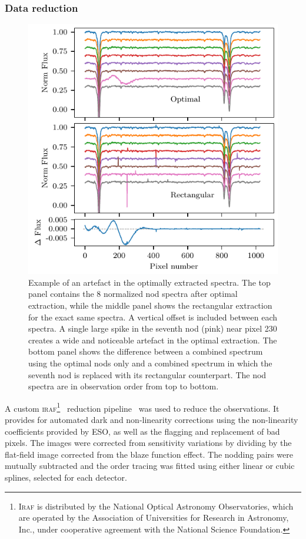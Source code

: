 \documentclass[fleqn,usenatbib]{mnras}
\begin{document}
    \subsubsection{Data reduction}
    \label{subsubsec:reduction}
    \begin{figure}
        \includegraphics[width=\hsize]{images/fig1.pdf}
        \caption{Example of an artefact in the optimally extracted spectra. The top panel contains the 8 normalized nod spectra after optimal extraction, while the middle panel shows the rectangular extraction for the exact same spectra. A vertical offset is included between each spectra. A single large spike in the seventh nod (pink) near pixel 230 creates a wide and noticeable artefact in the optimal extraction. The bottom panel shows the difference between a combined spectrum using the optimal nods only and a combined spectrum in which the seventh nod is replaced with its rectangular counterpart. The nod spectra are in observation order from top to bottom.}
        \label{fig:nod_artefacts}
    \end{figure}
    
    A custom \textsc{iraf}\footnote{\textsc{Iraf} is distributed by the National Optical Astronomy Observatories, which are operated by the Association of Universities for Research in Astronomy, {Inc.}, under cooperative agreement with the National Science Foundation.}~\citep{tody_iraf_1993} reduction pipeline~\citep{figueira_radial_2010} was used to reduce the observations. It provides for automated dark and non-linearity corrections using the non-linearity coefficients provided by ESO, as well as the flagging and replacement of bad pixels. The images were corrected from sensitivity variations by dividing by the flat-field image corrected from the blaze function effect. The nodding pairs were mutually subtracted and the order tracing was fitted using either linear or cubic splines, selected for each detector.
    
\end{document}
